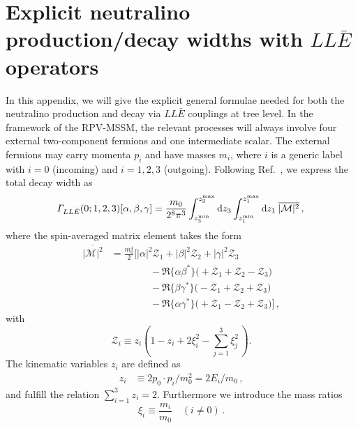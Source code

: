 \section{Explicit neutralino production/decay widths with $LL\bar{E}$ operators}\label{sec:appendixA}
In this appendix, we will give the explicit general formulae needed for both the neutralino production and decay via $LL\bar E$ couplings at tree level. 
In the framework of the RPV-MSSM, the relevant processes will always involve four external two-component fermions and one intermediate scalar. The external fermions may carry momenta $p_i$ and have masses $m_i$, where $i$ is a generic label with $i = 0$ (incoming) and $i=1,2,3$ (outgoing). Following Ref.~\cite{Dreiner:2008tw}, we express the total decay width as 
\begin{equation}
    \label{eq:generic_LLE_width}
    \varGamma_{LL\bar E} (0;1,2,3)[\alpha,\beta,\gamma] = \frac{m_0}{2^8\pi^3} \int_{z_{3}^\text{min}}^{z_{3}^\text{max}} \text{d} z_{3} \int_{z_1^\text{min}}^{z_1^\text{max}} \text{d} z_1 \:\overline{|\mathcal{M}|^2} \, , \\
\end{equation}
where the spin-averaged matrix element takes the form
\begin{align}
    \label{eq:LLE_ME}
    \overline{|\mathcal{M}|^2} &= \frac{m_0^4}{2} \bigg[ |\alpha|^2 \mathcal{Z}_1 + |\beta|^2 \mathcal{Z}_2 + |\gamma|^2 \mathcal{Z}_3 \nonumber \\
    & \qquad \qquad  - \Re\{\alpha \beta^*\} \Big(+\mathcal{Z}_1 + \mathcal{Z}_2 - \mathcal{Z}_3 \Big) \nonumber\\
    & \qquad \qquad  - \Re\{\beta \gamma^*\} \Big(-\mathcal{Z}_1 + \mathcal{Z}_2 + \mathcal{Z}_3 \Big) \nonumber \\
    & \qquad \qquad  - \Re\{\alpha \gamma^*\} \Big(+\mathcal{Z}_1 - \mathcal{Z}_2 + \mathcal{Z}_3 \Big)\bigg]\, ,
\end{align}
with
\begin{equation}
    \mathcal{Z}_i \equiv z_i \left(1-z_i+2\xi_i^2-\sum_{j=1}^3 \xi_j^2\, \right).
\end{equation}
The kinematic variables $z_{i}$ are defined as
\begin{align}
    z_{i} &\equiv 2p_0\cdot p_{i} / m_0^2 = 2E_{i}/m_0  \, ,
\end{align}
and fulfill the relation $\sum_{i=1}^3 z_i = 2$. Furthermore we introduce the mass ratios
\begin{equation}
    \xi_{i} \equiv \frac{m_{i}}{m_0} \quad (i \neq 0)\, .
\end{equation}
